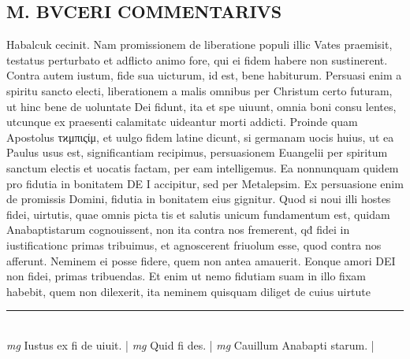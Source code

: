\documentclass{article}
\begin{document}
\begin{pages}
\section*{M. BVCERI COMMENTARIVS }
\marginpar{[ p.20 ]}\pstart Habalcuk cecinit.  Nam promissionem de liberatione populi illic Vates praemisit, testatus perturbato et adflicto animo fore, qui ei fidem habere non sustinerent. Contra autem iustum, fide sua uicturum, id est, bene habiturum.  Persuasi enim a spiritu sancto electi, liberationem a malis omnibus per Christum certo futuram, ut hinc bene de uoluntate Dei fidunt, ita et spe uiuunt, omnia boni consu lentes, utcunque ex praesenti calamitatc uideantur morti addicti.   \pend\pstart Proinde quam Apostolus τϰμπιςίμ, et uulgo fidem latine dicunt, si germanam uocis huius, ut ea Paulus usus est, significantiam recipimus, persuasionem Euangelii per spiritum sanctum electis et uocatis factam, per eam intelligemus. Ea nonnunquam quidem pro fidutia in bonitatem DE I accipitur, sed per Metalepsim.  Ex persuasione enim de promissis Domini, fidutia in bonitatem eius gignitur.  \pend\pstart Quod si noui illi hostes fidei, uirtutis, quae omnis picta tis et salutis unicum fundamentum est, quidam Anabaptistarum cognouissent, non ita contra nos fremerent, qđ fidei in iustificationc primas tribuimus, et agnoscerent friuolum esse, quod contra nos afferunt.  Neminem ei posse fidere, quem non antea amauerit.  Eonque amori DEI non fidei, primas tribuendas.  Et enim ut nemo fidutiam suam in illo fixam habebit, quem non dilexerit, ita neminem quisquam diliget de cuius uirtute  \pend
\vspace{0.5cm}\noindent
\vspace{0.2cm}\rule{1cm}{0.2pt}\\ 
\hspace{0.2cm}\textit{mg}
\footnotesize Iustus ex fi de uiuit.  
\normalsize| 
\hspace{0.2cm}\textit{mg}
\footnotesize Quid fi des.  
\normalsize| 
\hspace{0.2cm}\textit{mg}
\footnotesize Cauillum Anabapti starum.  
\normalsize| 

\end{pages}
\end{document}
